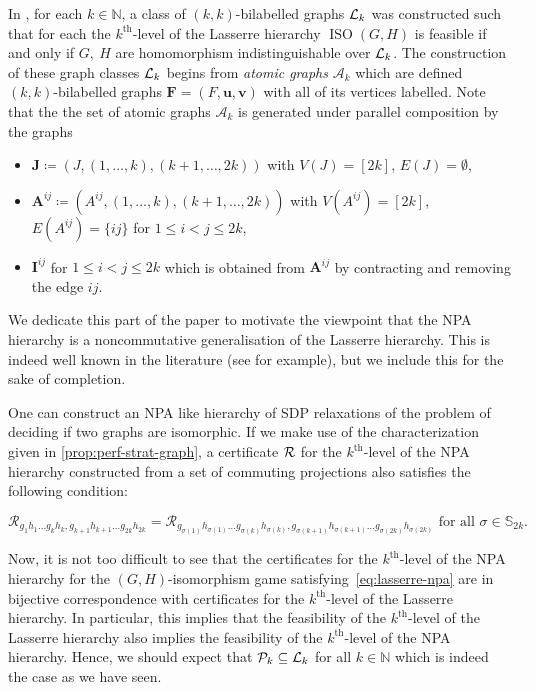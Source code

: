 \documentclass[11pt,a4paper]{article}
\theoremstyle{plain}
\theoremstyle{remark}
\theoremstyle{definition}
\DeclareMathOperator{\iso}{ISO}
\def\calA{{\mathcal A}} \def\calB{{\mathcal B}} \def\calC{{\mathcal C}}
\def\calP{{\mathcal P}} \def\calQ{{\mathcal Q}} \def\calR{{\mathcal R}}
\begin{document}
In \cite{roberson-seppelt-arxiv}, for each $k \in \mathbb{N}$, a class of $(k,k)$-bilabelled graphs ${\mathcal L}_k$ was constructed such that for each the $k^{\text{th}}$-level of the Lasserre hierarchy $\iso(G,H)$ is feasible if and only if $G,\ H$ are homomorphism indistinguishable over ${\mathcal L}_k$. The construction of these graph classes ${\mathcal L}_k$ begins from \emph{atomic graphs} $\calA_k$ which are defined $(k,k)$-bilabelled graphs $\boldsymbol{F} = (F, \boldsymbol{u}, \boldsymbol{v})$ with all of its vertices labelled. Note that the the set of atomic graphs $\mathcal{A}_k$ is generated under parallel composition by the graphs
		\begin{itemize}
			\item $\boldsymbol{J} \coloneqq (J, (1,\dots, k), (k+1, \dots, 2k))$ with $V(J) = [2k]$, $E(J) = \emptyset$,
			\item $\boldsymbol{A}^{ij} \coloneqq (A^{ij}, (1,\dots, k), (k+1, \dots, 2k))$ with $V(A^{ij}) = [2k]$, $E(A^{ij}) = \{ij\}$ for $1 \leq i < j \leq 2k$,
			\item $\boldsymbol{I}^{ij}$ for $1 \leq i < j \leq 2k$ which is obtained from $\boldsymbol{A}^{ij}$ by contracting and removing the edge $ij$. 
		\end{itemize}

  We dedicate this part of the paper to motivate the viewpoint that the NPA hierarchy is a noncommutative generalisation of the Lasserre hierarchy. This is indeed well known in the literature (see \cite{NPA-2, cstar-hierarchy} for example), but we include this for the sake of completion. 

  One can construct an NPA like hierarchy of SDP relaxations of the problem of deciding if two graphs are isomorphic. If we make use of the characterization given in \cref{prop:perf-strat-graph}, a certificate $\cal{R}$ for the $k^{\text{th}}$-level of the NPA hierarchy constructed from a set of commuting projections also satisfies the following condition:
  
  \begin{equation}\label{eq:lasserre-npa}
      \calR_{g_1h_1 \dots g_kh_k, g_{k+1}h_{k+1}\dots g_{2k}h_{2k} } = \calR_{g_{\sigma(1)}h_{\sigma(1)}\dots g_{\sigma(k)}h_{\sigma(k)}, g_{\sigma(k+1)}h_{\sigma(k+1)}\dots g_{\sigma(2k)}h_{\sigma(2k)}} \text{ for all } \sigma \in \mathbb{S}_{2k}. 
  \end{equation} 

  Now, it is not too difficult to see that the certificates for the $k^{\text{th}}$-level of the NPA hierarchy for the $(G,H)$-isomorphism game satisfying~\eqref{eq:lasserre-npa} are in bijective correspondence with certificates for the $k^{\text{th}}$-level of the Lasserre hierarchy. In particular, this implies that the feasibility of the $k^{\text{th}}$-level of the Lasserre hierarchy also implies the feasibility of the $k^{\text{th}}$-level of the NPA hierarchy. Hence, we should expect that $\calP_k \subseteq \calL_k$ for all $k \in \mathbb{N}$ which is indeed the case as we have seen. 
\end{document}
